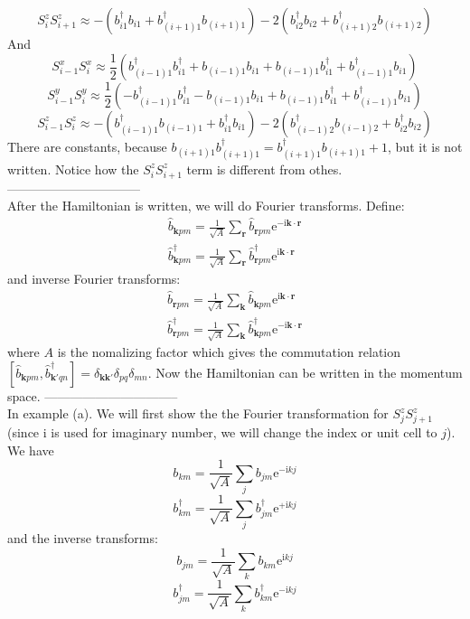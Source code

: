 \documentclass[letter]{article}
\newcommand{\e}{\mathrm{e}}
\newcommand{\ii}{\mathrm{i}}
\begin{document}
$$
    S_{i}^z S_{i+1}^z \approx-\left(b_{i1}^{\dagger}b_{i1}+b_{(i+1)1}^{\dagger}b_{(i+1)1}\right)-2\left(b_{i2}^{\dagger}b_{i2}+b_{(i+1)2}^{\dagger}b_{(i+1)2}\right)
$$
And $$
S_{i-1}^x S_{i}^x  \approx\frac{1}{2}\left(b_{(i-1)1}^{\dagger}b_{i1}^{\dagger}+b_{(i-1)1}b_{i1}+b_{(i-1)1}b_{i1}^{\dagger}+b_{(i-1)1}^{\dagger}b_{i1}\right)
$$
$$
S_{i-1}^y S_{i}^y \approx\frac{1}{2}\left(-b_{(i-1)1}^{\dagger}b_{i1}^{\dagger}-b_{(i-1)1}b_{i1}+b_{(i-1)1}b_{i1}^{\dagger}+b_{(i-1)1}^{\dagger}b_{i1}\right)
$$
$$
    S_{i-1}^z S_{i}^z \approx-\left(b_{(i-1)1}^{\dagger}b_{(i-1)1}+b_{i1}^{\dagger}b_{i1}\right)-2\left(b_{(i-1)2}^{\dagger}b_{(i-1)2}+b_{i2}^{\dagger}b_{i2}\right)
$$
There are constants, because $b_{(i+1)1}b_{(i+1)1}^{\dagger}=b_{(i+1)1}^{\dagger}b_{(i+1)1}+1$, but it is not written. Notice how the $S_{i}^z S_{i+1}^z$  term is different from othes.\\
--------------------------------\\
After the Hamiltonian is written, we will do Fourier transforms. Define:
$$ \begin{aligned}
    \hat{b}_{\bm{k}pm}=\frac{1}{\sqrt{A}}\sum_{\bm{r}}\hat{b}_{\bm{r}pm}\e^{-\ii\bm{k}\cdot\bm{r}} \\
    \hat{b}_{\bm{k}pm}^{\dagger}=\frac{1}{\sqrt{A}}\sum_{\bm{r}}\hat{b}_{\bm{r}pm}^{\dagger}\e^{\ii\bm{k}\cdot\bm{r}}
    \end{aligned} $$
and inverse Fourier transforms:
$$ \begin{aligned}
    \hat{b}_{\bm{r}pm}=\frac{1}{\sqrt{A}}\sum_{\bm{k}}\hat{b}_{\bm{k}pm}\e^{\ii\bm{k}\cdot\bm{r}} \\
    \hat{b}_{\bm{r}pm}^{\dagger}=\frac{1}{\sqrt{A}}\sum_{\bm{k}}\hat{b}_{\bm{k}pm}^{\dagger}\e^{-\ii\bm{k}\cdot\bm{r}}
    \end{aligned} $$
where $A$ is the nomalizing factor which gives the commutation relation $\left[\hat{b}_{\bm{k}pm},\hat{b}_{\bm{k'}qn}^{\dagger}\right]=\delta_{\bm{k}\bm{k}'}\delta_{pq}\delta_{mn}$. Now the Hamiltonian can be written in the momentum space.
--------------------------------\\
In example (a). 
We will first show the the Fourier transformation for $S_j^z S_{j+1}^z$(since i is used for imaginary number, we will change the index or unit cell to $j$).
We have $$
b_{km}=\frac{1}{\sqrt{A}}\sum_{j}b_{jm}\e^{-\ii k j}
$$$$
b^{\dagger}_{km}=\frac{1}{\sqrt{A}}\sum_{j}b_{jm}^{\dagger}\e^{+\ii k j}
$$
and the inverse transforms:$$
b_{jm}=\frac{1}{\sqrt{A}}\sum_{k}b_{km}\e^{\ii k j}
$$$$
b^{\dagger}_{jm}=\frac{1}{\sqrt{A}}\sum_{k}b_{km}^{\dagger}\e^{-\ii k j}
$$
\end{document}
